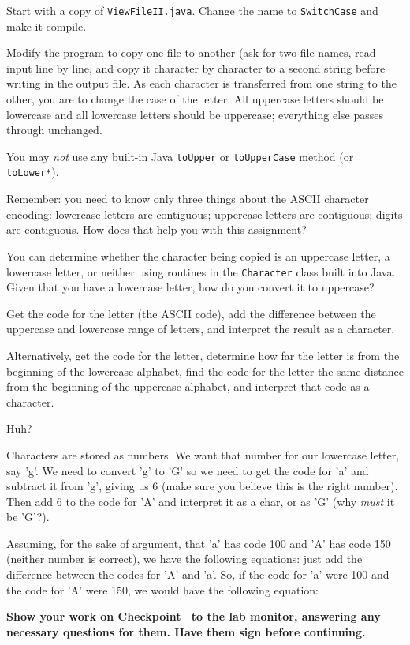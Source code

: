 \documentclass[12pt,oneside]{memoir}
\newcommand\code[1]{\lstinline^#1^}
\newcommand\fname[1]{\texttt{#1}}
\newenvironment{Checkpoint}[1]{%
  \begin{Exercise}[name={Checkpoint},title={#1}]}{%
  \end{Exercise}%
  \textbf{Show your work on Checkpoint~\theExercise{} to the lab monitor, %
    answering any necessary questions for them.  Have them sign before continuing.}}
\begin{document}
\begin{Checkpoint}{SwitchCase.java}
Start with a copy of \fname{ViewFileII.java}. Change the name to
\code{SwitchCase} and make it compile.

Modify the program to copy one file to another (ask for two file
names, read input line by line, and copy it character by character to
a second string before writing in the output file. As each character
is transferred from one string to the other, you are to change the
case of the letter. All uppercase letters should be lowercase and all
lowercase letters should be uppercase; everything else passes through
unchanged.

You may \emph{not} use any built-in Java \code{toUpper} or
\code{toUpperCase} method (or \code{toLower*}). 

Remember: you need to know only three things about the ASCII character
encoding: lowercase letters are contiguous; uppercase letters are
contiguous; digits are contiguous. How does that help you with this
assignment? 

You can determine whether the character being copied is an uppercase
letter, a lowercase letter, or neither using routines in the
\code{Character} class built into Java. Given that you have a
lowercase letter, how do you convert it to uppercase?

Get the code for the letter (the ASCII code), add the difference
between the uppercase and lowercase range of letters, and interpret
the result as a character.

Alternatively, get the code for the letter, determine how far the
letter is from the beginning of the lowercase alphabet, find the code
for the letter the same distance from the beginning of the uppercase
alphabet, and interpret that code as a character.

Huh?

Characters are stored as numbers. We want that number for our
lowercase letter, say 'g'. We need to convert 'g' to 'G' so we need
to get the code for 'a' and subtract it from 'g', giving us 6 (make
sure you believe this is the right number). Then add 6 to the code for
'A' and interpret it as a char, or as 'G' (why \emph{must} it be
'G'?).

Assuming, for the sake of argument, that 'a' has code 100 and 'A' has
code 150 (neither number is correct), we have the following equations:
just add the difference
between the codes for 'A' and 'a'. So, if the code for 'a' were 100 and
the code for 'A' were 150, we would have the following equation:


\end{Checkpoint}
\end{document}
